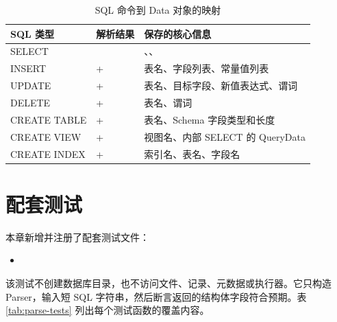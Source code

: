 \begin{table}[htbp]
  \centering
  \caption{SQL 命令到 Data 对象的映射}
  \label{tab:parse-command-data-map}
  \begin{tabularx}{\textwidth}{l l Y}
    \toprule
    SQL 类型 & 解析结果 & 保存的核心信息 \\
    \midrule
    SELECT &  & 、、\\
    INSERT &  +  & 表名、字段列表、常量值列表\\
    UPDATE &  +  & 表名、目标字段、新值表达式、谓词\\
    DELETE &  +  & 表名、谓词\\
    CREATE TABLE &  +  & 表名、Schema 字段类型和长度\\
    CREATE VIEW &  +  & 视图名、内部 SELECT 的 QueryData\\
    CREATE INDEX &  +  & 索引名、表名、字段名\\
    \bottomrule
  \end{tabularx}
\end{table}

\section{配套测试}
\label{sec:parse-test}

本章新增并注册了配套测试文件：

\begin{itemize}
  \item {}
\end{itemize}

该测试不创建数据库目录，也不访问文件、记录、元数据或执行器。它只构造 Parser，输入短 SQL 字符串，然后断言返回的结构体字段符合预期。表 \ref{tab:parse-tests} 列出每个测试函数的覆盖内容。

